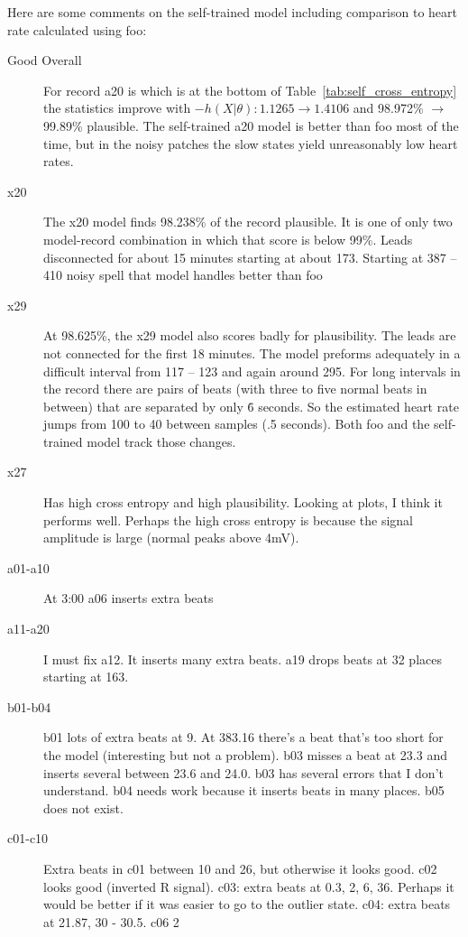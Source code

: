 \documentclass[12pt]{article}
\begin{document}
Here are some comments on the self-trained model including comparison
to heart rate calculated using foo:
\begin{description}
\item[Good Overall] For record a20 is which is at the bottom of
  Table~\ref{tab:self_cross_entropy} the statistics improve with
  $-h(X|\theta): 1.1265 \rightarrow 1.4106$ and 98.972\% $\rightarrow$
  99.89\% plausible.  The self-trained a20 model is better than foo
  most of the time, but in the noisy patches the slow states yield
  unreasonably low heart rates.
\item[x20] The x20 model finds 98.238\% of the record plausible.  It
  is one of only two model-record combination in which that score is
  below 99\%.  Leads disconnected for about 15 minutes starting at
  about 173.  Starting at 387 -- 410 noisy spell that model handles
  better than foo
\item[x29] At 98.625\%, the x29 model also scores badly for
  plausibility.  The leads are not connected for the first 18 minutes.
  The model preforms adequately in a difficult interval from 117 --
  123 and again around 295.  For long intervals in the record there
  are pairs of beats (with three to five normal beats in between) that
  are separated by only \.6 seconds.  So the estimated heart rate jumps
  from 100 to 40 between samples (.5 seconds).  Both foo and the
  self-trained model track those changes.
\item[x27] Has high cross entropy and high plausibility.  Looking at
  plots, I think it performs well.  Perhaps the high cross entropy is
  because the signal amplitude is large (normal peaks above 4mV).
\item[a01-a10] At 3:00 a06 inserts extra beats
\item[a11-a20] I must fix a12.  It inserts many extra beats.  a19
  drops beats at 32 places starting at 163.
\item[b01-b04] b01 lots of extra beats at 9.  At 383.16 there's a beat
  that's too short for the model (interesting but not a problem).  b03
  misses a beat at 23.3 and inserts several between 23.6 and 24.0.
  b03 has several errors that I don't understand.  b04 needs work
  because it inserts beats in many places.  b05 does not exist.
\item[c01-c10] Extra beats in c01 between 10 and 26, but otherwise it
  looks good.  c02 looks good (inverted R signal).  c03: extra beats
  at 0.3, 2, 6, 36.  Perhaps it would be better if it was easier to go
  to the outlier state.  c04: extra beats at 21.87, 30 - 30.5.  c06 2

\end{description}
\end{document}
